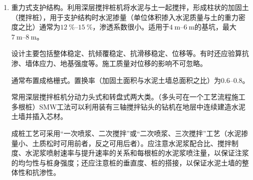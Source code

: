 \documentclass{book}
\begin{document}
\begin{enumerate}
          \par 围檩\footnote{支护板桩上部的横梁，起连接固定作用。}可用型钢或现浇混凝土结构，前者按简支梁计算，后者按连续梁计算。
          \par 一般钢板桩、混凝土板桩采用打入法。灌注桩和地下连续墙采用就地成孔（槽）现浇的方法。板桩施工要正确选择打桩方法、打桩机械和流水段划分，以保证刚度和防水性，且墙面要平直，封闭式板桩墙还要封闭合拢。
          \par 钢板桩的打桩方法通常有单独打入法\footnote{一角开始逐块插打，每块不停顿，打设快，但易向一边倾斜不易纠正，墙体平直度难控制，一般长度小于$\SI{10}{\m}$。}、围檩插桩法\footnote{用围檩支架作板桩打设导向装置。分单面围檩和双面围檩。可以保证尺寸准确和钢板桩垂直，但施工速度慢。}、分段复打法\footnote{一定数目钢板桩沿单层围檩插入土中从两端开始依次打入，打好后电焊固定在围檩上，最终形成屏风墙。桩锤重量一般为钢板桩2倍，不能过宽。}。
          \par 地下工程结束后钢板桩一般都要拔出，需正确选取方法和顺序，并应注浆填充。
    \item 重力式支护结构。利用深层搅拌桩机将水泥与土一起搅拌，形成柱状的加固土（搅拌桩），用于支护结构时水泥掺量（单位体积掺入水泥质量与土的重力密度之比）通常为$\SIrange{12}{15}{\percent}$，渗透系数很小。适用于$\SIrange{4}{6}{\m}$的基坑，最大$\SIrange{7}{8}{\m}$。
          \par 设计主要包括整体稳定、抗倾覆稳定、抗滑移稳定、位移等。有时还应验算抗渗、墙体应力、地基强度等。施工质量对位移的影响不可忽略。
          \par 通常布置成格栅式。置换率（加固土面积与水泥土墙总面积之比）为$\numrange{0.6}{0.8}$。
          \par 常用深层搅拌桩机分动力头式和转盘式两大类。（多头可在一个工艺流程施工多根桩）SMW工法可以利用装有三轴搅拌钻头的钻机在地层中连续建造水泥土墙并插入芯材。
          \par 成桩工艺可采用“一次喷浆、二次搅拌”或“二次喷浆、三次搅拌”工艺（水泥掺量小、土质松时可用前者，反之可用后者）。应注意水泥浆配合比、搅拌制度、水泥浆喷射速率与提升速率的关系和每根桩的水泥浆喷注量，以保证注浆的均匀性与桩身强度；还应注意桩的垂直度、桩的搭接，以保证水泥土墙的整体性和抗渗性。
\end{enumerate}
\end{document}
